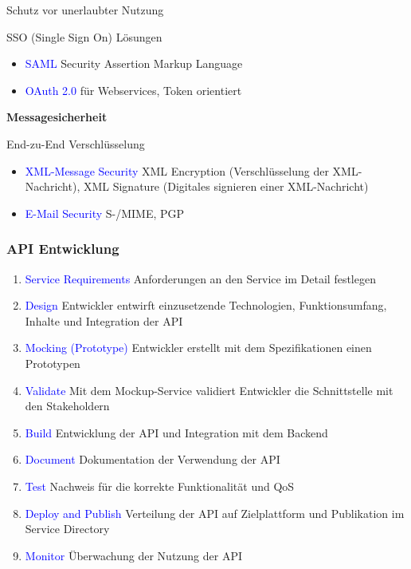 Schutz vor unerlaubter Nutzung

SSO (Single Sign On) Lösungen
\begin{itemize}
    \item \textcolor{blue}{SAML} Security Assertion Markup Language
    \item \textcolor{blue}{OAuth 2.0} für Webservices, Token orientiert
\end{itemize}
\vspace{10pt}
\textbf{Messagesicherheit}

End-zu-End Verschlüsselung

\begin{itemize}
    \item \textcolor{blue}{XML-Message Security} XML Encryption (Verschlüsselung der XML-Nachricht), XML Signature (Digitales signieren einer XML-Nachricht)
    \item \textcolor{blue}{E-Mail Security} S-/MIME, PGP
\end{itemize}


\subsubsection{API Entwicklung}

\begin{enumerate}
    \item \textcolor{blue}{Service Requirements} Anforderungen an den Service im Detail festlegen
    \item \textcolor{blue}{Design} Entwickler entwirft einzusetzende Technologien, Funktionsumfang, Inhalte und Integration der API
    \item \textcolor{blue}{Mocking (Prototype)} Entwickler erstellt mit dem Spezifikationen einen Prototypen
    \item \textcolor{blue}{Validate} Mit dem Mockup-Service validiert Entwickler die Schnittstelle mit den Stakeholdern
    \item \textcolor{blue}{Build} Entwicklung der API und Integration mit dem Backend
    \item \textcolor{blue}{Document} Dokumentation der Verwendung der API
    \item \textcolor{blue}{Test} Nachweis für die korrekte Funktionalität und QoS
    \item \textcolor{blue}{Deploy and Publish} Verteilung der API auf Zielplattform und Publikation im Service Directory
    \item \textcolor{blue}{Monitor} Überwachung der Nutzung der API
\end{enumerate}

